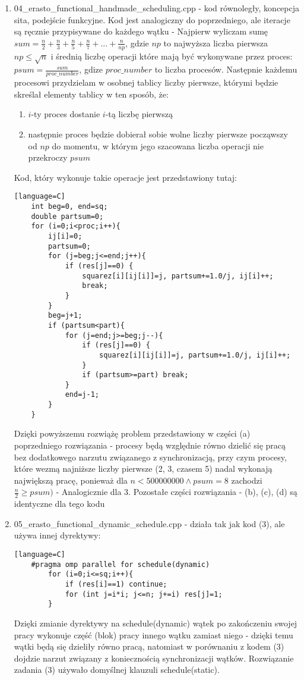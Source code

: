 \documentclass[12pt]{article}
\begin{document}
\begin {enumerate}
\begin{enumerate}
	\end{enumerate}
	\item 04\_erasto\_functional\_handmade\_scheduling.cpp - kod równoległy, koncepcja sita, podejście funkcyjne. Kod jest analogiczny do poprzedniego, ale iteracje są ręcznie przypisywane do każdego wątku - Najpierw wyliczam sumę \(sum=\frac{n}{2}+\frac{n}{3}+\frac{n}{5}+\frac{n}{7}+...+\frac{n}{np}\), gdzie \(np\) to najwyższa liczba pierwsza \(np\le\sqrt{n}\)  i średnią liczbę operacji które mają być wykonywane przez proces: \(psum=\frac{sum}{proc\_number}\), gdize \(proc\_number\) to liczba procesów. Następnie każdemu procesowi przydzielam w osobnej tablicy liczby pierwsze, którymi będzie skreślał elementy tablicy w ten sposób, że:
	\begin{enumerate}
		\item \(i\)-ty proces dostanie \(i\)-tą liczbę pierwszą
		\item następnie proces będzie dobierał sobie wolne liczby pierwsze począwszy od \(np\) do momentu, w którym jego szacowana liczba operacji nie przekroczy \(psum\)
	\end{enumerate}
	Kod, który wykonuje takie operacje jest przedstawiony tutaj:
	\begin{lstlisting}[style=mystyle, caption= Sito funkcyjne z ręcznym schedulingiem][language=C]
	int beg=0, end=sq;
	double partsum=0;
	for (i=0;i<proc;i++){
		ij[i]=0;
		partsum=0;
		for (j=beg;j<=end;j++){
			if (res[j]==0) {
				squarez[i][ij[i]]=j, partsum+=1.0/j, ij[i]++;
				break;
			}
		}
		beg=j+1;
		if (partsum<part){
			for (j=end;j>=beg;j--){
				if (res[j]==0) {
					squarez[i][ij[i]]=j, partsum+=1.0/j, ij[i]++;
				}
				if (partsum>=part) break;
			}
			end=j-1;
		}
	}
	\end{lstlisting}
	Dzięki powyższemu rozwiążę problem przedstawiony w części (a) poprzedniego rozwiązania - procesy będą względnie równo dzielić się pracą bez dodatkowego narzutu związanego z synchronizacją, przy czym procesy, które wezmą najniższe liczby pierwsze (2, 3, czasem 5) nadal wykonają największą pracę, ponieważ dla \(n<500000000 \land psum=8\) zachodzi \(\frac{n}{2}\ge psum)\) - Analogicznie dla 3. Pozostałe części rozwiązania - (b), (c), (d) są identyczne dla tego kodu
	\item 05\_erasto\_functional\_dynamic\_schedule.cpp - działa tak jak kod (3), ale używa innej dyrektywy:
	\begin{lstlisting}[style=mystyle, caption= Sito funkcyjne z dynamic schedulingiem][language=C]
	#pragma omp parallel for schedule(dynamic)
		for (i=0;i<=sq;i++){
			if (res[i]==1) continue;
			for (int j=i*i; j<=n; j+=i) res[j]=1;
		}
	\end{lstlisting}
	Dzięki zmianie dyrektywy na schedule(dynamic) wątek po zakończeniu swojej pracy wykonuje część (blok) pracy innego wątku zamiast niego - dzięki temu wątki będą się dzieliły równo pracą, natomiast w porównaniu z kodem (3) dojdzie narzut związany z koniecznością synchronizacji wątków. Rozwiązanie zadania (3) używało domyślnej klauzuli schedule(static).
	
\end {enumerate}
\end{document}
